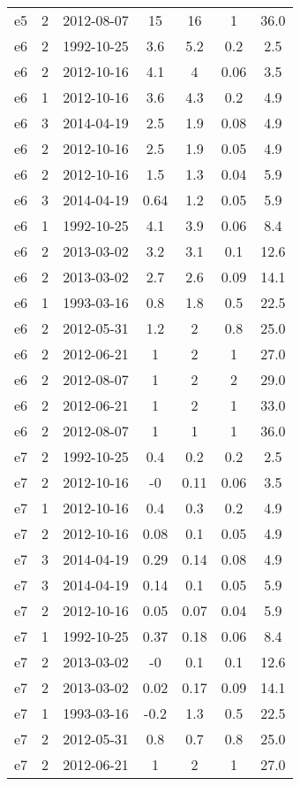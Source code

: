 \begin{table*}[htp]
\begin{tabular}{ccccccc}
e5 & 2 & 2012-08-07 & 15 & 16 & 1 & 36.0 \\
e6 & 2 & 1992-10-25 & 3.6 & 5.2 & 0.2 & 2.5 \\
e6 & 2 & 2012-10-16 & 4.1 & 4 & 0.06 & 3.5 \\
e6 & 1 & 2012-10-16 & 3.6 & 4.3 & 0.2 & 4.9 \\
e6 & 3 & 2014-04-19 & 2.5 & 1.9 & 0.08 & 4.9 \\
e6 & 2 & 2012-10-16 & 2.5 & 1.9 & 0.05 & 4.9 \\
e6 & 2 & 2012-10-16 & 1.5 & 1.3 & 0.04 & 5.9 \\
e6 & 3 & 2014-04-19 & 0.64 & 1.2 & 0.05 & 5.9 \\
e6 & 1 & 1992-10-25 & 4.1 & 3.9 & 0.06 & 8.4 \\
e6 & 2 & 2013-03-02 & 3.2 & 3.1 & 0.1 & 12.6 \\
e6 & 2 & 2013-03-02 & 2.7 & 2.6 & 0.09 & 14.1 \\
e6 & 1 & 1993-03-16 & 0.8 & 1.8 & 0.5 & 22.5 \\
e6 & 2 & 2012-05-31 & 1.2 & 2 & 0.8 & 25.0 \\
e6 & 2 & 2012-06-21 & 1 & 2 & 1 & 27.0 \\
e6 & 2 & 2012-08-07 & 1 & 2 & 2 & 29.0 \\
e6 & 2 & 2012-06-21 & 1 & 2 & 1 & 33.0 \\
e6 & 2 & 2012-08-07 & 1 & 1 & 1 & 36.0 \\
e7 & 2 & 1992-10-25 & 0.4 & 0.2 & 0.2 & 2.5 \\
e7 & 2 & 2012-10-16 & -0 & 0.11 & 0.06 & 3.5 \\
e7 & 1 & 2012-10-16 & 0.4 & 0.3 & 0.2 & 4.9 \\
e7 & 2 & 2012-10-16 & 0.08 & 0.1 & 0.05 & 4.9 \\
e7 & 3 & 2014-04-19 & 0.29 & 0.14 & 0.08 & 4.9 \\
e7 & 3 & 2014-04-19 & 0.14 & 0.1 & 0.05 & 5.9 \\
e7 & 2 & 2012-10-16 & 0.05 & 0.07 & 0.04 & 5.9 \\
e7 & 1 & 1992-10-25 & 0.37 & 0.18 & 0.06 & 8.4 \\
e7 & 2 & 2013-03-02 & -0 & 0.1 & 0.1 & 12.6 \\
e7 & 2 & 2013-03-02 & 0.02 & 0.17 & 0.09 & 14.1 \\
e7 & 1 & 1993-03-16 & -0.2 & 1.3 & 0.5 & 22.5 \\
e7 & 2 & 2012-05-31 & 0.8 & 0.7 & 0.8 & 25.0 \\
e7 & 2 & 2012-06-21 & 1 & 2 & 1 & 27.0 \\

\end{tabular}
\end{table*}
